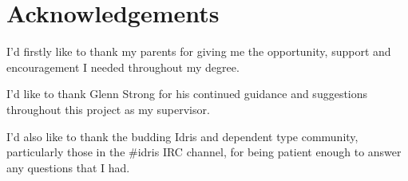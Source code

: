 \chapter*{Acknowledgements}
I'd firstly like to thank my parents for giving me the opportunity, support and
encouragement I needed throughout my degree.

I'd like to thank Glenn Strong for his continued guidance and suggestions
throughout this project as my supervisor.

I'd also like to thank the budding Idris and dependent type community,
particularly those in the \#idris IRC channel, for being patient enough to
answer any questions that I had.
